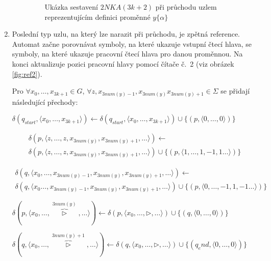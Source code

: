 \documentclass[thesis=B,czech]{FITthesis}[2019/12/23]
\theoremstyle{definition}
\begin{document}
\begin{enumerate}
\begin{enumerate}
\begin{figure}[ht]
\begin{tikzpicture}
	\end{tikzpicture}
	\caption{Ukázka sestavení $2NKA(3k+2)$ při průchodu uzlem reprezentujícím definici proměnné $y\{\alpha\}$}
	\label{fig:def2}
\end{figure}

	\end{enumerate}
	\item \label{itm:ref2}{Poslední typ uzlu, na který lze narazit při průchodu, je zpětná reference. Automat začne porovnávat symboly, na které ukazuje vstupní čtecí hlava, se symboly, na které ukazuje pracovní čtecí hlava pro danou proměnnou. Na konci aktualizuje pozici pracovní hlavy pomocí čítače č.~2 (viz obrázek \ref{fig:ref2}).

Pro  $\forall x_0, \dots, x_{3k+1} \in G$, $\forall z, x_{3num(y)-1}, x_{3num(y)} x_{3num(y)+1} \in \Sigma$ se přidají následující přechody:

	$\delta(q_{start}, \langle  x_0, \dots, x_{3k+1}\rangle)\leftarrow\delta(q_{start}, \langle  x_0, \dots, x_{3k+1}\rangle)\cup\{(p, \langle 0, \dots, 0\rangle)\}$

	 \begin{equation*}\begin{split}\delta(p, \langle  z, \dots, z, x_{3num(y)}, x_{3num(y)+1},\dots \rangle)\leftarrow\\\delta(p, \langle z, \dots, z, x_{3num(y)}, x_{3num(y)+1},\dots \rangle)\cup\{(p, \langle 1, \dots, 1, -1, 1 \dots\rangle)\}\end{split}\end{equation*}

	 \begin{equation*}\begin{split}\delta(q, \langle  x_0, \dots,  x_{3num(y)-1}, x_{3num(y)}, x_{3num(y)+1},\dots \rangle)\leftarrow\\\delta(q, \langle x_0 \dots, x_{3num(y)-1}, x_{3num(y)}, x_{3num(y)+1},\dots \rangle)\cup\{(p, \langle 0, \dots, -1, 1, -1 \dots\rangle)\}\end{split}\end{equation*}

	$\delta(p, \langle  x_0, \dots, \overbrace{\triangleright}^{3num(y)}, \dots \rangle)\leftarrow\delta(p, \langle  x_0, \dots, \triangleright, \dots \rangle)\cup\{(q, \langle 0, \dots, 0\rangle)\}$

	$\delta(q, \langle  x_0, \dots, \overbrace{\triangleright}^{3num(y)+1}, \dots \rangle)\leftarrow\delta(q, \langle  x_0, \dots, \triangleright, \dots \rangle)\cup\{(q_end, \langle 0, \dots, 0\rangle)\}$
	}


\end{enumerate}
\end{document}
